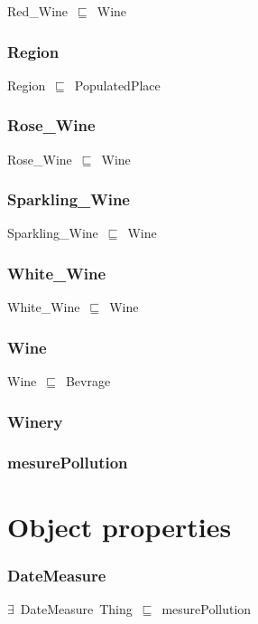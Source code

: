 \documentclass{article}
\begin{document}
Red\_Wine~\ensuremath{\sqsubseteq}~Wine~

\subsubsection*{Region}

Region~\ensuremath{\sqsubseteq}~PopulatedPlace~

\subsubsection*{Rose\_Wine}

Rose\_Wine~\ensuremath{\sqsubseteq}~Wine~

\subsubsection*{Sparkling\_Wine}

Sparkling\_Wine~\ensuremath{\sqsubseteq}~Wine~

\subsubsection*{White\_Wine}

White\_Wine~\ensuremath{\sqsubseteq}~Wine~

\subsubsection*{Wine}

Wine~\ensuremath{\sqsubseteq}~Bevrage~

\subsubsection*{Winery}

\subsubsection*{mesurePollution}

\section*{Object properties}\subsubsection*{DateMeasure}

\ensuremath{\exists}~DateMeasure~Thing~\ensuremath{\sqsubseteq}~mesurePollution
\end{document}
